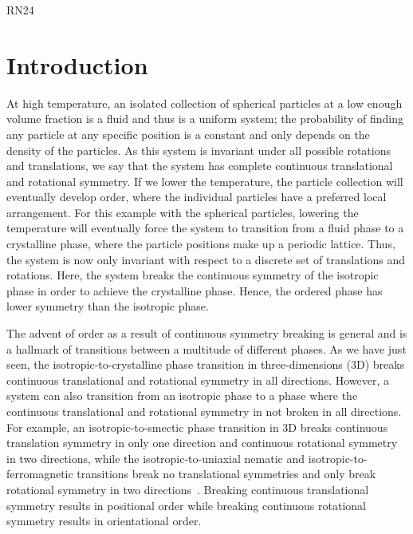 RN24%
\chapter{Introduction}\label{c:1}
At high temperature, an isolated collection of spherical particles at a low enough volume fraction is a fluid and thus is a uniform system; the probability of finding any particle at any specific position is a constant and only depends on the density of the particles.
As this system is invariant under all possible rotations and translations, we say that the system has complete continuous translational and rotational symmetry.
If we lower the temperature, the particle collection will eventually develop order, where the individual particles have a preferred local arrangement.
For this example with the spherical particles, lowering the temperature will eventually force the system to transition from a fluid phase to a crystalline phase, where the particle positions make up a periodic lattice.
Thus, the system is now only invariant with respect to a discrete set of translations and rotations.
Here, the system breaks the continuous symmetry of the isotropic phase in order to achieve the crystalline phase.
Hence, the ordered phase has lower symmetry than the isotropic phase.

The advent of order as a result of continuous symmetry breaking is general and is a hallmark of transitions between a multitude of different phases.
As we have just seen, the isotropic-to-crystalline phase transition in three-dimensions (3D) breaks continuous translational and rotational symmetry in all directions.
However, a system can also transition from an isotropic phase to a phase where the continuous translational and rotational symmetry in not broken in all directions.
For example, an isotropic-to-smectic phase transition in 3D breaks continuous translation symmetry in only one direction and continuous rotational symmetry in two directions, while the isotropic-to-uniaxial nematic and isotropic-to-ferromagnetic transitions break no translational symmetries and only break rotational symmetry in two directions~\cite{RN175}. Breaking continuous translational symmetry results in positional order while breaking continuous rotational symmetry results in orientational order.

